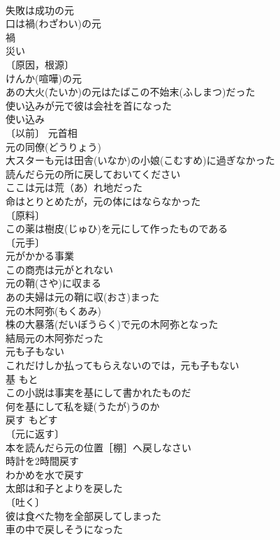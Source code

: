 \documentclass[8pt]{extreport}
\begin{document}
\begin{CJK}{UTF8}{min}
\\	失敗は成功の元 
\\	口は禍(わざわい)の元 
\\	禍 
\\	災い 
\\	〔原因，根源〕
\\	けんか(喧嘩)の元 
\\	あの大火(たいか)の元はたばこの不始末(ふしまつ)だった 
\\	使い込みが元で彼は会社を首になった 
\\	使い込み 
\\	〔以前〕 元首相 
\\	元の同僚(どうりょう) 
\\	大スターも元は田舎(いなか)の小娘(こむすめ)に過ぎなかった 
\\	読んだら元の所に戻しておいてください 
\\	ここは元は荒（あ）れ地だった 
\\	命はとりとめたが，元の体にはならなかった 
\\	〔原料〕
\\	この薬は樹皮(じゅひ)を元にして作ったものである 
\\	〔元手〕
\\	元がかかる事業 
\\	この商売は元がとれない 
\\	元の鞘(さや)に収まる 
\\	あの夫婦は元の鞘に収(おさ)まった 
\\	元の木阿弥(もくあみ)　
\\	株の大暴落(だいぼうらく)で元の木阿弥となった 
\\	結局元の木阿弥だった 
\\	元も子もない 
\\	これだけしか払ってもらえないのでは，元も子もない 
\\	基	もと	
\\	この小説は事実を基にして書かれたものだ 
\\	何を基にして私を疑(うたが)うのか 
\\	戻す	もどす	
\\	〔元に返す〕
\\	本を読んだら元の位置［棚］へ戻しなさい 
\\	時計を2時間戻す 
\\	わかめを水で戻す 
\\	太郎は和子とよりを戻した 
\\	〔吐く〕
\\	彼は食べた物を全部戻してしまった 
\\	車の中で戻しそうになった 

\end{CJK}
\end{document}
